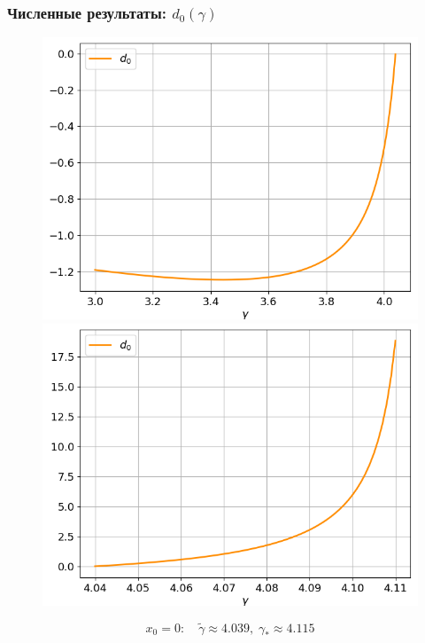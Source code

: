 \documentclass[fullscreen=true, unicode, bookmarks=false]{beamer}
\begin{document}
\begin{frame}
\frametitle{ Численные результаты: $ d_0(\gamma) $ }

\begin{figure} 
\includegraphics[scale=0.33]{divergent_d0_before_0.png}  
\hfill
\includegraphics[scale=0.33]{divergent_d0_after_0.png}  
\end{figure}

$$ x_0 = 0: \quad \tilde{\gamma} \approx 4.039, \; \gamma_* \approx 4.115 $$

\end{frame}
\end{document}

